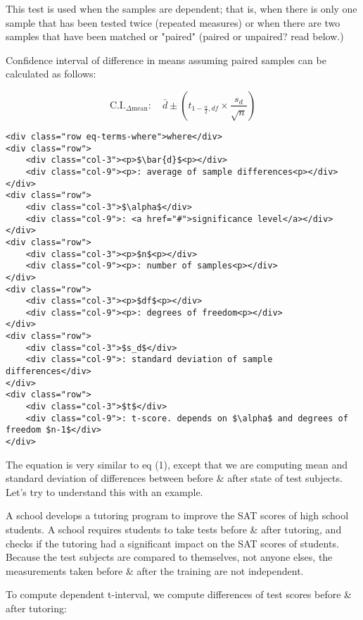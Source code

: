 \documentclass[11pt]{article}
\begin{document}
This test is used when the samples are dependent; that is, when there is
only one sample that has been tested twice (repeated measures) or when
there are two samples that have been matched or "paired" (paired or
unpaired? read below.)

Confidence interval of difference in means assuming paired samples can
be calculated as follows:

\hypertarget{eq-8}{}
\[ \text{C.I.}_{\Delta \text{mean}}: \quad \bar{d} \pm (t_{1-\frac{\alpha}{2}, df} \times \frac{s_d}{\sqrt{n}})\tag{8}\]

\begin{verbatim}
<div class="row eq-terms-where">where</div>
<div class="row">
    <div class="col-3"><p>$\bar{d}$<p></div>
    <div class="col-9"><p>: average of sample differences<p></div>
</div>
<div class="row">
    <div class="col-3">$\alpha$</div>
    <div class="col-9">: <a href="#">significance level</a></div>
</div>    
<div class="row">
    <div class="col-3"><p>$n$<p></div>
    <div class="col-9"><p>: number of samples<p></div>
</div>
<div class="row">
    <div class="col-3"><p>$df$<p></div>
    <div class="col-9"><p>: degrees of freedom<p></div>
</div>    
<div class="row">
    <div class="col-3">$s_d$</div>
    <div class="col-9">: standard deviation of sample differences</div>
</div>   
<div class="row">
    <div class="col-3">$t$</div>
    <div class="col-9">: t-score. depends on $\alpha$ and degrees of freedom $n-1$</div>
</div>   
\end{verbatim}

The equation is very similar to eq (1), except that we are computing
mean and standard deviation of differences between before \& after state
of test subjects. Let's try to understand this with an example.

A school develops a tutoring program to improve the SAT scores of high
school students. A school requires students to take tests before \&
after tutoring, and checks if the tutoring had a significant impact on
the SAT scores of students. Because the test subjects are compared to
themselves, not anyone elses, the measurements taken before \& after the
training are not independent.

To compute dependent t-interval, we compute differences of test scores
before \& after tutoring:
\end{document}
